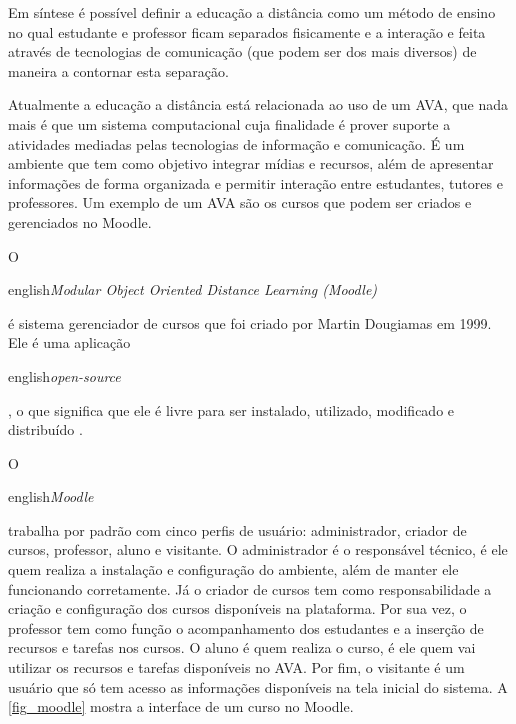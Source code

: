 \documentclass[
	12pt,				%
	openright,			%
	oneside,			%
	a4paper,			%
	english,			%
	french,				%
	spanish,			%
	brazil				%
	]{abntex2}
\begin{document}
Em síntese é possível definir a educação a distância como um método de ensino no qual estudante e professor ficam separados fisicamente e a interação e feita através de tecnologias de comunicação (que podem ser dos mais diversos) de maneira a contornar esta separação.

Atualmente a educação a distância está relacionada ao uso de um AVA, que nada mais é que um sistema computacional cuja finalidade é prover suporte a atividades mediadas pelas tecnologias de informação e comunicação\cite{Almeida2010}. É um ambiente que tem como objetivo integrar mídias e recursos, além de apresentar informações de forma organizada e permitir interação entre estudantes, tutores e professores\cite{Franciscato2008}. Um exemplo de um AVA são os cursos que podem ser criados e gerenciados no Moodle.
   
O \begin{otherlanguage*}{english}\textit{Modular Object Oriented Distance Learning (Moodle)}\end{otherlanguage*} é sistema gerenciador de cursos que foi criado por Martin Dougiamas em 1999. Ele é uma aplicação \begin{otherlanguage*}{english}\textit{open-source}\end{otherlanguage*}, o que significa que ele é livre para ser instalado, utilizado, modificado e distribuído \cite{Dougiamas2003}. 

O \begin{otherlanguage*}{english}\textit{Moodle}\end{otherlanguage*} trabalha por padrão com cinco perfis de usuário: administrador, criador de cursos, professor, aluno e visitante. O administrador é o responsável técnico, é ele quem realiza a instalação e configuração do ambiente, além de manter ele funcionando corretamente. Já o criador de cursos tem como responsabilidade a criação e configuração dos cursos disponíveis na plataforma. Por sua vez, o professor tem como função o acompanhamento dos estudantes e a inserção de recursos e tarefas nos cursos. O aluno é quem realiza o curso, é ele quem vai utilizar os recursos e tarefas disponíveis no AVA. Por fim, o visitante é um usuário que só tem acesso as informações disponíveis na tela inicial do sistema. A \autoref{fig_moodle} mostra a interface de um curso no Moodle.
\end{document}
